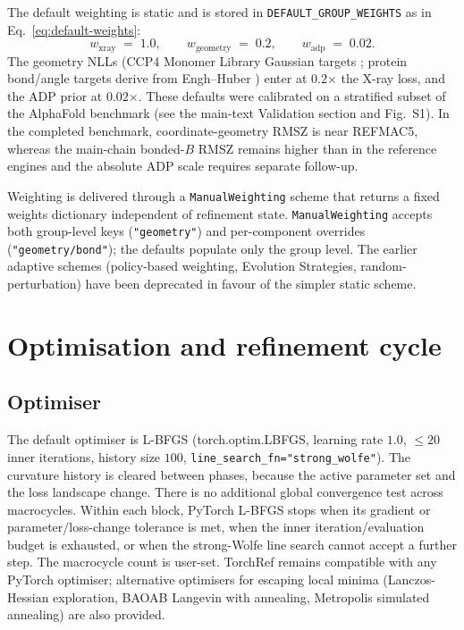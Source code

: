 \documentclass{iucrjournals}
\newcommand{\xfac}{\mathbin{\boldsymbol{\times}}}
\begin{document}
The default weighting is static and is stored in
\texttt{DEFAULT\_GROUP\_WEIGHTS} as in Eq.~\ref{eq:default-weights}:
%
\begin{equation}
  w_\mathrm{xray} \;=\; 1.0, \qquad
  w_\mathrm{geometry} \;=\; 0.2, \qquad
  w_\mathrm{adp} \;=\; 0.02.
  \label{eq:default-weights}
\end{equation}
%
The geometry NLLs (CCP4 Monomer Library Gaussian targets \cite{long_acedrg_2017}; protein bond/angle targets derive from Engh--Huber \cite{engh_accurate_1991}) enter at
$0.2\xfac$ the X-ray loss, and the ADP prior at $0.02\xfac$.  These defaults
were calibrated on a stratified subset of the AlphaFold benchmark
(see the main-text Validation section and Fig.~S1). In the completed benchmark,
coordinate-geometry RMSZ is near REFMAC5, whereas the main-chain bonded-$B$
RMSZ remains higher than in the reference engines and the absolute ADP scale
requires separate follow-up.

Weighting is delivered through a \texttt{ManualWeighting} scheme that
returns a fixed weights dictionary independent of refinement state.
\texttt{ManualWeighting} accepts both group-level keys
(\texttt{"geometry"}) and per-component overrides
(\texttt{"geometry/bond"}); the defaults populate only the group level.
The earlier adaptive schemes (policy-based weighting, Evolution Strategies,
random-perturbation) have been deprecated in favour of the simpler static scheme.

\section{Optimisation and refinement cycle}

\subsection{Optimiser}

The default optimiser is L-BFGS (torch.optim.LBFGS, learning rate $1.0$,
$\leq 20$ inner iterations, history size $100$,
\texttt{line\_search\_fn="strong\_wolfe"}).
The curvature history is cleared between phases, because the active parameter
set and the loss landscape change.
There is no additional global convergence test across macrocycles. Within each
block, PyTorch L-BFGS stops when its gradient or parameter/loss-change tolerance
is met, when the inner iteration/evaluation budget is exhausted, or when the
strong-Wolfe line search cannot accept a further step. The macrocycle count is
user-set.
TorchRef remains compatible with any PyTorch optimiser; alternative optimisers
for escaping local minima (Lanczos-Hessian exploration, BAOAB Langevin with
annealing, Metropolis simulated annealing) are also provided.
\end{document}
